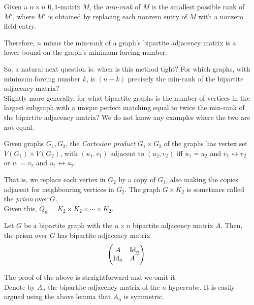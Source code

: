 \begin{fdef}
	Given a $n \times n$ $0,1$-matrix $M$, the \emph{min-rank} of $M$ is the smallest possible rank of $M'$, where $M'$ is obtained by replacing each nonzero entry of $M$ with a nonzero field entry.
\end{fdef}

Therefore, $n$ minus the min-rank of a graph's bipartite adjacency matrix is a lower bound on the graph's minimum forcing number.

So, a natural next question is: when is this method tight? For which graphs, with minimum forcing number $k$, is $(n-k)$ precisely the min-rank of the bipartite adjacency matrix?\\
Slightly more generally, for what bipartite graphs is the number of vertices in the largest subgraph with a unique perfect matching equal to twice the min-rank of the bipartite adjacency matrix? We do not know any examples where the two are not equal.


\begin{fdef}
	Given graphs $G_1,G_2$, the \emph{Cartesian product} $G_1 \times G_2$ of the graphs has vertex set $V(G_1) \times V(G_2)$, with $(u_1,v_1)$ adjacent to $(u_2,v_2)$ iff $u_1 = u_2$ and $v_1 \leftrightarrow v_2$ or $v_1 = v_2$ and $u_1 \leftrightarrow u_2$.
\end{fdef}

That is, we replace each vertex in $G_2$ by a copy of $G_1$, also making the copies adjacent for neighbouring vertices in $G_2$. The graph $G \times K_2$ is sometimes called the \emph{prism} over $G$.\\
Given this, $Q_n = K_2 \times K_2 \times \cdots \times K_2$.

\begin{flem}
	Let $G$ be a bipartite graph with the $n \times n$ bipartite adjacency matrix $A$. Then, the prism over $G$ has bipartite adjacency matrix
	\[ \begin{pmatrix} A & \operatorname{Id}_n \\ \operatorname{Id}_n & A^\top \end{pmatrix}. \]
\end{flem}
The proof of the above is straightforward and we omit it.\\

Denote by $A_n$ the bipartite adjacency matrix of the $n$-hypercube. It is easily argued using the above lemma that $A_n$ is symmetric.

